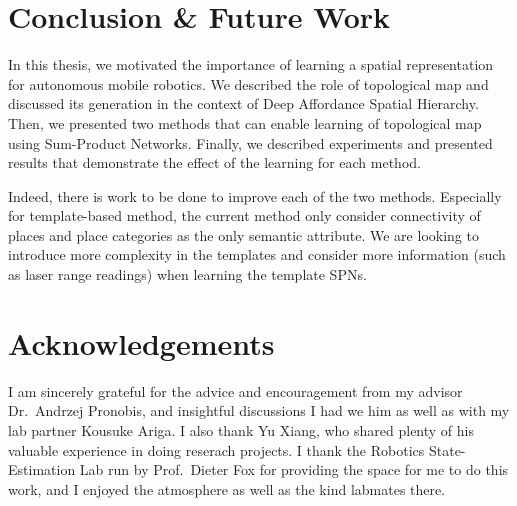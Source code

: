 \documentclass[10pt, titlepage]{article}
\theoremstyle{definition}
\begin{document}
\section{Conclusion \& Future Work}\label{section:conclusion}

In this thesis, we motivated the importance of learning a spatial representation for autonomous mobile robotics. We described the role of topological map and discussed its generation in the context of Deep Affordance Spatial Hierarchy. Then, we presented two methods that can enable learning of topological map using Sum-Product Networks. Finally, we described experiments and presented results that demonstrate the effect of the learning for each method.

Indeed, there is work to be done to improve each of the two methods. Especially for template-based method, the current method only consider connectivity of places and place categories as the only semantic attribute. We are looking to introduce more complexity in the templates and consider more information (such as laser range readings) when learning the template SPNs.

\section{Acknowledgements}\label{section:acknowledgement}

I am sincerely grateful for the advice and encouragement from my advisor Dr.~Andrzej Pronobis, and insightful discussions I had we him as well as with my lab partner Kousuke Ariga. I also thank Yu Xiang, who shared plenty of his valuable experience in doing reserach projects. I thank the Robotics State-Estimation Lab run by Prof.~Dieter Fox for providing the space for me to do this work, and I enjoyed the atmosphere as well as the kind labmates there.


\nocite{*}




\newpage
\appendix
\end{document}
